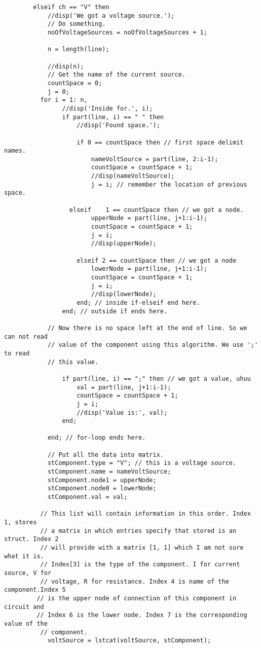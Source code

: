\documentclass[a4paper,10pt]{article}
\begin{document}
\begin{verbatim}
        elseif ch == "V" then
            //disp('We got a voltage source.');
            // Do something.
            noOfVoltageSources = noOfVoltageSources + 1;

            n = length(line);

            //disp(n);
            // Get the name of the current source.
            countSpace = 0;
            j = 0;
          for i = 1: n,
                //disp('Inside for.', i);
                if part(line, i) == " " then
                    //disp('Found space.');

                    if 0 == countSpace then // first space delimit names.
                        nameVoltSource = part(line, 2:i-1);
                        countSpace = countSpace + 1;
                        //disp(nameVoltSource);
                        j = i; // remember the location of previous space.

                  elseif    1 == countSpace then // we got a node.
                        upperNode = part(line, j+1:i-1);
                        countSpace = countSpace + 1;
                        j = i;
                        //disp(upperNode);

                    elseif 2 == countSpace then // we got a node
                        lowerNode = part(line, j+1:i-1);
                        countSpace = countSpace + 1;
                        j = i;
                        //disp(lowerNode);
                    end; // inside if-elseif end here.
                end; // outside if ends here.

            // Now there is no space left at the end of line. So we can not read
            // value of the component using this algorithm. We use ';' to read
            // this value.

                if part(line, i) == ";" then // we got a value, uhuu
                    val = part(line, j+1:i-1);
                    countSpace = countSpace + 1;
                    j = i;
                    //disp('Value is:', val);
                end;

            end; // for-loop ends here.

            // Put all the data into matrix.
            stComponent.type = "V"; // this is a voltage source.
            stComponent.name = nameVoltSource;
            stComponent.node1 = upperNode;
            stComponent.node0 = lowerNode;
            stComponent.val = val;

          // This list will contain information in this order. Index 1, stores
          // a matrix in which entries specify that stored is an struct. Index 2
          // will provide with a matrix [1, 1] which I am not sure what it is.
          // Index[3] is the type of the component. I for current source, V for
          // voltage, R for resistance. Index 4 is name of the component.Index 5
         // is the upper node of connection of this component in circuit and
         // Index 6 is the lower node. Index 7 is the corresponding value of the
          // component.
            voltSource = lstcat(voltSource, stComponent);



\end{verbatim}
\end{document}
